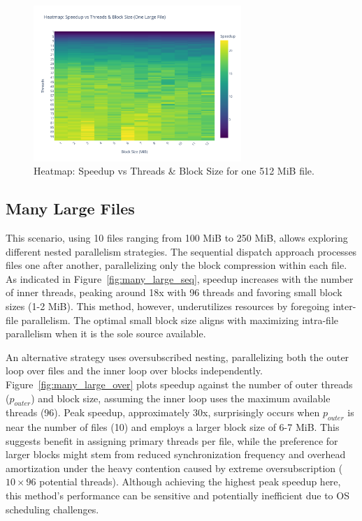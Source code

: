\documentclass[10pt]{article}
\begin{document}
\begin{figure}[hbtp]
    \centering
    \includegraphics[width=0.7\textwidth]{../results/plots/one_large/speedup_matrix_one_large.pdf}
    \caption{Heatmap: Speedup vs Threads \& Block Size for one 512 MiB file.}
    \label{fig:one_large}
\end{figure}

\subsection*{Many Large Files}
This scenario, using 10 files ranging from 100 MiB to 250 MiB, allows exploring different nested parallelism strategies. The sequential dispatch approach processes files one after another, parallelizing only the block compression within each file. As indicated in Figure~\ref{fig:many_large_seq}, speedup increases with the number of inner threads, peaking around 18x with 96 threads and favoring small block sizes (1-2 MiB). This method, however, underutilizes resources by foregoing inter-file parallelism. The optimal small block size aligns with maximizing intra-file parallelism when it is the sole source available.

An alternative strategy uses oversubscribed nesting, parallelizing both the outer loop over files and the inner loop over blocks independently. Figure~\ref{fig:many_large_over} plots speedup against the number of outer threads ($p_{outer}$) and block size, assuming the inner loop uses the maximum available threads (96). Peak speedup, approximately 30x, surprisingly occurs when $p_{outer}$ is near the number of files (10) and employs a larger block size of 6-7 MiB. This suggests benefit in assigning primary threads per file, while the preference for larger blocks might stem from reduced synchronization frequency and overhead amortization under the heavy contention caused by extreme oversubscription ($10 \times 96$ potential threads). Although achieving the highest peak speedup here, this method's performance can be sensitive and potentially inefficient due to OS scheduling challenges.
\end{document}
